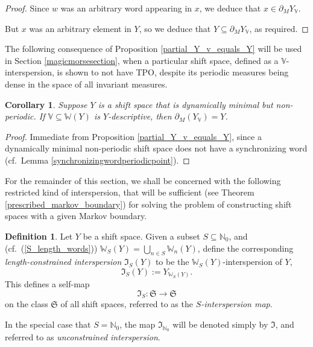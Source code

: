 \documentclass[reqno,11pt]{amsart}
\newtheorem{cor}[thm]{Corollary}
\theoremstyle{definition}
\newtheorem{defn}[thm]{Definition}
\theoremstyle{remark}
\theoremstyle{remark}
\def \N {\mathbb N}
\def\w{\mathbb{W}}
\def\s{\mathfrak{S}}
\def\i{\mathfrak{I}}
\def\v{\mathbb V}
\numberwithin{equation}{section}
\begin{document}
\begin{proof}
Since $w$ was an arbitrary word appearing in $x$, we deduce that $x\in \partial_M Y_\v$.

But $x$ was an arbitrary element in $Y$, so we deduce that $Y\subseteq \partial_M Y_\v$, as required.
\end{proof}

The following consequence of Proposition \ref{partial_Y_v_equals_Y} will be used in Section \ref{magicmorsesection}, when a particular 
shift space, defined as a
$\v$-interspersion,
is shown to not have TPO, despite its periodic measures being dense in the space of all invariant measures.

\begin{cor}\label{minimal_partial_Y_v_equals_Y}
Suppose $Y$ is a shift space that  is dynamically minimal but non-periodic.
If $\v\subseteq\w(Y)$
is $Y$-descriptive,
then  $\partial_M( Y_\v ) = Y$.
\end{cor}
\begin{proof}
Immediate from Proposition \ref{partial_Y_v_equals_Y}, since a dynamically minimal non-periodic shift space does not have a synchronizing word (cf.~Lemma \ref{synchronizingwordperiodicpoint}).
\end{proof}





For the remainder of this section, we shall be
concerned with the following restricted kind of interspersion, that will be sufficient
(see Theorem \ref{prescribed_markov_boundary})
 for solving the problem
of constructing shift spaces with a given Markov boundary.

\begin{defn}
Let $Y$ be a shift space.
Given a subset $S\subseteq\N_0$, 
and (cf.~(\ref{S_length_words})) $\w_S(Y)=\bigcup_{n\in S} \w_n(Y)$,
 define the corresponding \emph{length-constrained interspersion}
$\i_S(Y)$ to be the $\w_S(Y)$-interspersion of $Y$,
\begin{equation}
\i_S(Y) := Y_{\w_S(Y)}.
\end{equation}
This defines a self-map
$$\i_S:\s\to\s$$
on the class $\s$ of all shift spaces,
referred to as the \emph{$S$-interspersion map}.

\noindent In the special case that $S=\N_0$, the map $\i_{\N_0}$ will be denoted simply by $\i$, and referred to as \emph{unconstrained interspersion}.
\end{defn}
\end{document}
